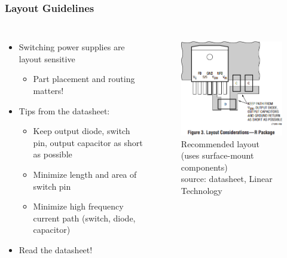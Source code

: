 \documentclass{beamer}
\begin{document}
\begin{frame}
\frametitle{Layout Guidelines}
\begin{columns}[t]
\begin{itemize}
  \item Switching power supplies are layout sensitive
  \begin{itemize}
    \item Part placement and routing matters!
  \end{itemize}
  \item Tips from the datasheet:
  \begin{itemize}
    \item Keep output diode, switch pin, output capacitor as short as possible
    \item Minimize length and area of switch pin
    \item Minimize high frequency current path (switch, diode, capacitor)
  \end{itemize}
  \item Read the datasheet!
\end{itemize}

\begin{figure}
  \centering
  \includegraphics[width=1.0\columnwidth]{images-dis4/lt1370-layout} \\
  Recommended layout \\
  \tiny (uses surface-mount components) \\
  \tiny source: datasheet, Linear Technology
\end{figure}
\end{columns}
\end{frame}
\end{document}
